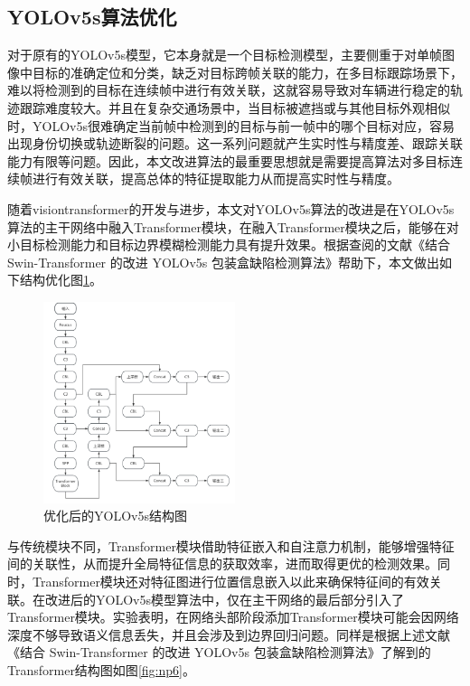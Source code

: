 \subsection{YOLOv5s算法优化}
对于原有的YOLOv5s模型，它本身就是一个目标检测模型，主要侧重于对单帧图像中目标的准确定位和分类，缺乏对目标跨帧关联的能力，在多目标跟踪场景下，难以将检测到的目标在连续帧中进行有效关联，这就容易导致对车辆进行稳定的轨迹跟踪难度较大。并且在复杂交通场景中，当目标被遮挡或与其他目标外观相似时，YOLOv5s很难确定当前帧中检测到的目标与前一帧中的哪个目标对应，容易出现身份切换或轨迹断裂的问题。这一系列问题就产生实时性与精度差、跟踪关联能力有限等问题。因此，本文改进算法的最重要思想就是需要提高算法对多目标连续帧进行有效关联，提高总体的特征提取能力从而提高实时性与精度。


随着visiontransformer的开发与进步\cite{2020arXiv201011929D}，本文对YOLOv5s算法的改进是在YOLOv5s算法的主干网络中融入Transformer模块，在融入Transformer模块之后，能够在对小目标检测能力和目标边界模糊检测能力具有提升效果。根据查阅的文献《结合 Swin-Transformer 的改进 YOLOv5s 包装盒缺陷检测算法》\cite{zhao2024jiheswin}帮助下，本文做出如下结构优化图\ref{fig:np5}。

\begin{figure}[htbp] %
	\centering
	\includegraphics[width=0.5\textwidth]{np5} %
	\caption{优化后的YOLOv5s结构图} %
	\label{fig:np5} %
\end{figure}


与传统模块不同，Transformer模块借助特征嵌入和自注意力机制，能够增强特征间的关联性，从而提升全局特征信息的获取效率，进而取得更优的检测效果。同时，Transformer模块还对特征图进行位置信息嵌入以此来确保特征间的有效关联。在改进后的YOLOv5s模型算法中，仅在主干网络的最后部分引入了Transformer模块。实验表明，在网络头部阶段添加Transformer模块可能会因网络深度不够导致语义信息丢失，并且会涉及到边界回归问题。同样是根据上述文献《结合 Swin-Transformer 的改进 YOLOv5s 包装盒缺陷检测算法》了解到的Transformer结构图如图\ref{fig:np6}。

